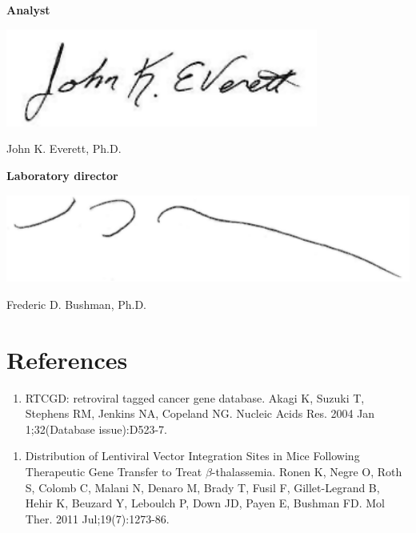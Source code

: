 \documentclass[12pt,]{article}
\providecommand{\tightlist}{%
  \setlength{\itemsep}{0pt}\setlength{\parskip}{0pt}}
\begin{document}
\newpage

\textbf{Analyst}

\includegraphics[width=4.04in]{./data/Everett_signature}

John K. Everett, Ph.D.

\vspace{0.5cm}

\textbf{Laboratory director}

\includegraphics[width=5.99in]{./data/Bushman_signature}

Frederic D. Bushman, Ph.D.

\vspace{2.0cm}

\section{References}\label{references}

\begin{enumerate}
\def\labelenumi{\arabic{enumi}.}
\tightlist
\item
  RTCGD: retroviral tagged cancer gene database. Akagi K, Suzuki T,
  Stephens RM, Jenkins NA, Copeland NG. Nucleic Acids Res. 2004 Jan
  1;32(Database issue):D523-7.
\end{enumerate}

\vspace{0.1cm}

\begin{enumerate}
\def\labelenumi{\arabic{enumi}.}
\setcounter{enumi}{1}
\tightlist
\item
  Distribution of Lentiviral Vector Integration Sites in Mice Following
  Therapeutic Gene Transfer to Treat \(\beta\)-thalassemia. Ronen K,
  Negre O, Roth S, Colomb C, Malani N, Denaro M, Brady T, Fusil F,
  Gillet-Legrand B, Hehir K, Beuzard Y, Leboulch P, Down JD, Payen E,
  Bushman FD. Mol Ther. 2011 Jul;19(7):1273-86.
\end{enumerate}
\end{document}
